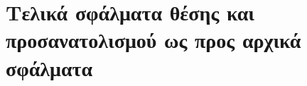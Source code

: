 \section{Τελικά σφάλματα θέσης και προσανατολισμού ως προς αρχικά σφάλματα}
  \label{appendix:05:pos_orient_errors}
  

